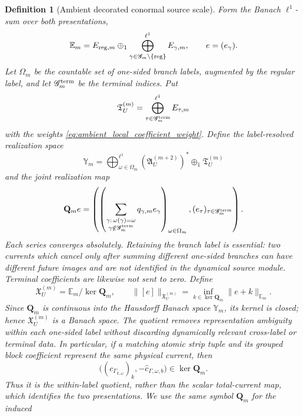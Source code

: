 \documentclass[11pt]{amsart}
\theoremstyle{compactplain}
\theoremstyle{compactdefinition}
\newtheorem{definition}[theorem]{Definition}
\theoremstyle{compactremark}
\begin{document}
\begin{definition}[Ambient decorated conormal source scale]
Form the Banach \(\ell^1\)-sum over both presentations,
\begin{equation}
\label{eq:ambient_l1_source_sum}
 \mathbb E_m
 =E_{{\rm reg},m}\oplus_1
   \bigoplus_{\gamma\in\mathscr G_m\setminus\{{\rm reg}\}}^{\ell^1}
     E_{\gamma,m},
 \qquad e=(e_\gamma).
\end{equation}
Let \(\Omega_m\) be the countable set of one-sided branch labels, augmented by
the regular label, and let \(\mathscr G_m^{\rm term}\) be the terminal
indices.  Put
\[
 \mathfrak T_U^{(m)}
 =\bigoplus_{\tau\in\mathscr G_m^{\rm term}}^{\ell^1}E_{\tau,m}
\]
with the weights \eqref{eq:ambient_local_coefficient_weight}.  Define the label-resolved realization space
\[
 \mathbb Y_m
 =
 \bigoplus_{\omega\in\Omega_m}^{\ell^1}
   (\mathfrak A_U^{(m+2)})^*
 \oplus_1\mathfrak T_U^{(m)}
\]
and the joint realization map
\begin{equation}
\label{eq:ambient_joint_realization_map}
 \mathbf Q_m e
 =
 \left(
  \left(\sum_{\substack{\gamma:\,\omega(\gamma)=\omega\\
                         \gamma\notin\mathscr G_m^{\rm term}}}
       q_{\gamma,m}e_\gamma\right)_{\omega\in\Omega_m},
  (e_\tau)_{\tau\in\mathscr G_m^{\rm term}}
 \right).
\end{equation}
Each series converges absolutely.  Retaining the branch label is essential:
two currents which cancel only after summing different one-sided branches can
have different future images and are not identified in the dynamical source
module.  Terminal coefficients are likewise not sent to zero.  Define
\begin{equation}
\label{eq:ambient_conormal_source_norm}
 \mathfrak X_U^{(m)}=\mathbb E_m/\ker \mathbf Q_m,
 \qquad
 \|[e]\|_{\mathfrak X_U^{(m)}}
   =\inf_{k\in\ker \mathbf Q_m}\|e+k\|_{\mathbb E_m}.
\end{equation}
Since \(\mathbf Q_m\) is continuous into the Hausdorff Banach space
\(\mathbb Y_m\), its kernel is closed; hence \(\mathfrak X_U^{(m)}\) is a
Banach space.  The quotient removes representation ambiguity within each
one-sided label without discarding dynamically relevant cross-label or
terminal data.  In particular, if a matching atomic strip tuple and its
grouped block coefficient represent the same physical current, then
\[
 \big((c_{\Gamma_{k,\omega}})_k,
       -\widehat c_{\Gamma,\omega,b}\big)
 \in\ker\mathbf Q_m.
\]
Thus it is the within-label quotient, rather than the scalar total-current
map, which identifies the two presentations.  We use the same symbol
\(\mathbf Q_m\) for the induced

\end{definition}
\end{document}
